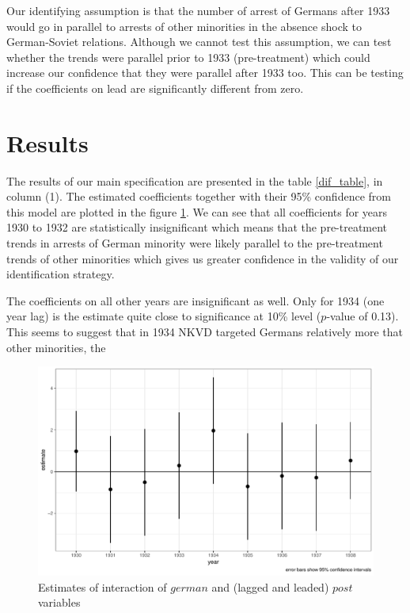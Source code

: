 \documentclass[12pt]{article}
\begin{document}
Our identifying assumption is that the number of arrest of Germans after 1933 would go in parallel to arrests of other minorities in the absence shock to German-Soviet relations. Although we cannot test this assumption, we can test whether the trends were parallel prior to 1933 (pre-treatment) which could increase our confidence that they were parallel after 1933 too. This can be testing if the coefficients on lead are significantly different from zero.  
\section{Results}
The results of our main specification are presented in the table \ref{dif_table}, in column (1). The estimated coefficients together with their 95\% confidence  from this model are plotted in the figure \ref{fig_did_effets}. We can see that all coefficients for years 1930 to 1932 are statistically insignificant which means that the pre-treatment trends in arrests of German minority were likely parallel to the pre-treatment trends of other minorities which gives us greater  confidence in the validity of our identification strategy. 

The coefficients on all other years are insignificant as well. Only for 1934 (one year lag) is the estimate  quite close to significance at 10\% level ($p$-value of 0.13). This seems to suggest that in 1934 NKVD targeted Germans  relatively more that other minorities, the 
\begin{figure}[h]
\centering
\includegraphics[width=\textwidth]{plots/did_effects.pdf}
\caption{Estimates of interaction of $german$ and (lagged and leaded) $post$ variables}
\label{fig_did_effets}
\end{figure}
\end{document}
